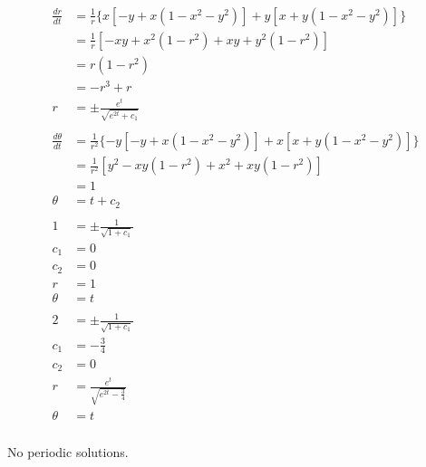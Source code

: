 \documentclass{article}
\begin{document}
\setcounter{subsubsection}{24}
\subsubsection{}

\begin{align*}
  \frac{d r}{d t}      & = \frac{1}{r} \{ x [-y + x (1 - x^2 - y^2)] + y [x + y (1 - x^2 - y^2)] \}    \\
                       & = \frac{1}{r} [-x y + x^2 (1 - r^2) + x y + y^2 (1 - r^2)]                    \\
                       & = r (1 - r^2)                                                                 \\
                       & = -r^3 + r                                                                    \\
  r                    & = \pm \frac{e^t}{\sqrt{e^{2 t} + c_1}}                                        \\ \\
  \frac{d \theta}{d t} & = \frac{1}{r^2} \{ -y [-y + x (1 - x^2 - y^2)] + x [x + y (1 - x^2 - y^2)] \} \\
                       & = \frac{1}{r^2} [y^2 - x y (1 - r^2) + x^2 + x y (1 - r^2)]                   \\
                       & = 1                                                                           \\
  \theta               & = t + c_2                                                                     \\ \\
  1                    & = \pm \frac{1}{\sqrt{1 + c_1}}                                                \\
  c_1                  & = 0                                                                           \\
  c_2                  & = 0                                                                           \\
  r                    & = 1                                                                           \\
  \theta               & = t                                                                           \\ \\
  2                    & = \pm \frac{1}{\sqrt{1 + c_1}}                                                \\
  c_1                  & = -\frac{3}{4}                                                                \\
  c_2                  & = 0                                                                           \\
  r                    & = \frac{e^t}{\sqrt{e^{2 t} - \frac{3}{4}}}                                    \\
  \theta               & = t
\end{align*}

\setcounter{subsubsection}{26}
\subsubsection{}

No periodic solutions.
\end{document}
